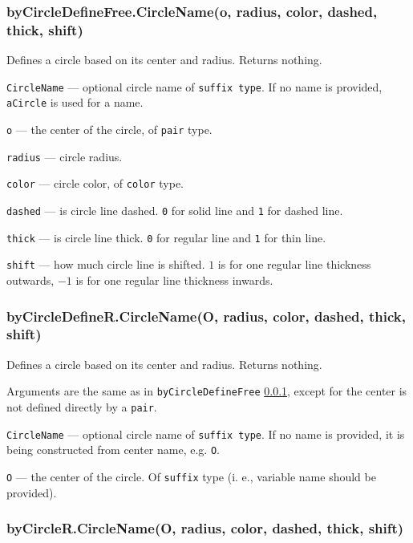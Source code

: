 \documentclass{ltxdoc}
\begin{document}

\subsubsection{byCircleDefineFree.CircleName(o, radius, color, dashed, thick, shift)}\label{byCircleDefineFree}
	
	Defines a circle based on its center and radius. Returns nothing.
	
	\texttt{CircleName} — optional circle name of \texttt{suffix type}. If no name is provided, \texttt{aCircle} is used for a name.
	
	\texttt{o} — the center of the circle, of \texttt{pair} type.
	
	\texttt{radius} — circle radius.
	
	\texttt{color} — circle color, of \texttt{color} type.
	
	\texttt{dashed} — is circle line dashed. \texttt{0} for solid line and \texttt{1} for dashed line.
	
	\texttt{thick} — is circle line thick. \texttt{0} for regular line and \texttt{1} for thin line.
	
	\texttt{shift} — how much circle line is shifted. \texttt{$1$} is for one regular line thickness outwards, \texttt{$-1$} is for one regular line thickness inwards.

\subsubsection{byCircleDefineR.CircleName(O, radius, color, dashed, thick, shift)}\label{byCircleDefineR}
	
	Defines a circle based on its center and radius. Returns nothing.
	
	Arguments are the same as in \texttt{byCircleDefineFree} \ref{byCircleDefineFree}, except for the center is not defined directly by a \texttt{pair}.
	
	\texttt{CircleName} — optional circle name of \texttt{suffix type}. If no name is provided, it is being constructed from center name, e.g. \texttt{O}.
	
	\texttt{O} — the center of the circle. Of \texttt{suffix} type (i. e., variable name should be provided).

\subsubsection{byCircleR.CircleName(O, radius, color, dashed, thick, shift)}\label{byCircleR}
	
\end{document}
